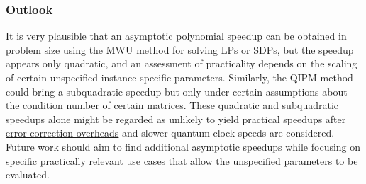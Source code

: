 \begin{refsection}
\subsubsection*{Outlook}

It is very plausible that an asymptotic polynomial speedup can be obtained in problem size using the MWU method for solving LPs or SDPs, but the speedup appears only quadratic, and an assessment of practicality depends on the scaling of certain unspecified instance-specific parameters. Similarly, the QIPM method could bring a subquadratic speedup but only under certain assumptions about the condition number of certain matrices. These quadratic and subquadratic speedups alone might be regarded as unlikely to yield practical speedups after \hyperref[prim:FTQC]{error correction overheads} and slower quantum clock speeds are considered. Future work should aim to find additional asymptotic speedups while focusing on specific practically relevant use cases that allow the unspecified parameters to be evaluated. 

\printbibliography[heading=secbib,segment=\therefsegment]
\end{refsection}

\newpage



